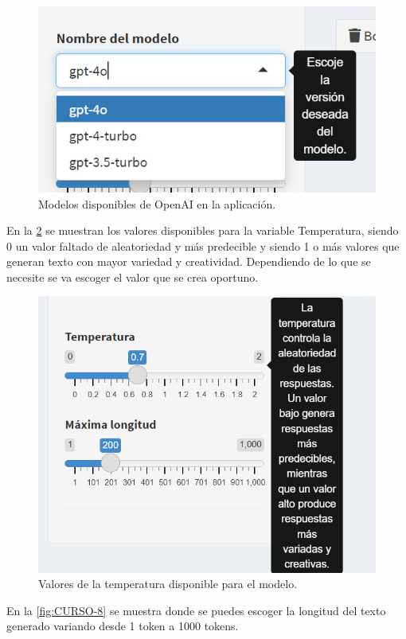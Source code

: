 \documentclass[
]{book}
\begin{document}
\begin{figure}

{\centering \includegraphics[width=0.6\linewidth]{FIG7} 

}

\caption{Modelos disponibles  de OpenAI en la aplicación.}\label{fig:CURSO-6}
\end{figure}

En la \ref{fig:CURSO-7} se muestran los valores disponibles para la variable Temperatura, siendo 0 un valor faltado de aleatoriedad y más predecible y siendo 1 o más valores que generan texto con mayor variedad y creatividad. Dependiendo de lo que se necesite se va escoger el valor que se crea oportuno.

\begin{figure}

{\centering \includegraphics[width=0.6\linewidth]{FIG8} 

}

\caption{Valores de la temperatura disponible para el modelo.}\label{fig:CURSO-7}
\end{figure}

En la \ref{fig:CURSO-8} se muestra donde se puedes escoger la longitud del texto generado variando desde 1 token a 1000 tokens.
\end{document}
